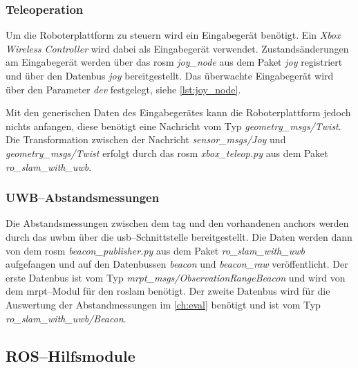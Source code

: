 \subsubsection{Teleoperation}

Um die Roboterplattform zu steuern wird ein Eingabegerät benötigt. Ein \textit{Xbox Wireless Controller} wird dabei als Eingabegerät verwendet. Zustandsänderungen am Eingabegerät werden über das \Gls{rosm} \textit{joy\_node} aus dem Paket \textit{joy} registriert und über den Datenbus \textit{joy} bereitgestellt. Das überwachte Eingabegerät wird über den Parameter \textit{dev} festgelegt, siehe \autoref{lst:joy_node}.

Mit den generischen Daten des Eingabegerätes kann die Roboterplattform jedoch nichts anfangen, diese benötigt eine Nachricht vom Typ \textit{geometry\_msgs/Twist}. Die Transformation zwischen der Nachricht \textit{sensor\_msgs/Joy} und \textit{geometry\_msgs/Twist} erfolgt durch das \Gls{rosm} \textit{xbox\_teleop.py} aus dem Paket \textit{ro\_slam\_with\_uwb}.


\begin{comment}
--------------------------------------------------------------------------------
todo: Nicht Abstandsmessung sondern Entfernungsmessung
\end{comment}
\subsubsection{UWB--Abstandsmessungen}

Die Abstandsmessungen zwischen dem \Gls{tag} und den vorhandenen \Glspl{anchor} werden durch das \Gls{uwbm} über die \Gls{usb}--Schnittstelle bereitgestellt. Die Daten werden dann von dem \Gls{rosm} \textit{beacon\_publisher.py} aus dem Paket \textit{ro\_slam\_with\_uwb} aufgefangen und auf den Datenbussen \textit{beacon} und \textit{beacon\_raw} veröffentlicht. Der erste Datenbus ist vom Typ \textit{mrpt\_msgs/ObservationRangeBeacon} und wird von dem \Gls{mrpt}--Modul für den \Gls{roslam} benötigt. Der zweite Datenbus wird für die Auswertung der Abstandmessungen im \autoref{ch:eval} benötigt und ist vom Typ \textit{ro\_slam\_with\_uwb/Beacon}.


\begin{comment}
--------------------------------------------------------------------------------
\end{comment}
\subsection{ROS--Hilfsmodule}


